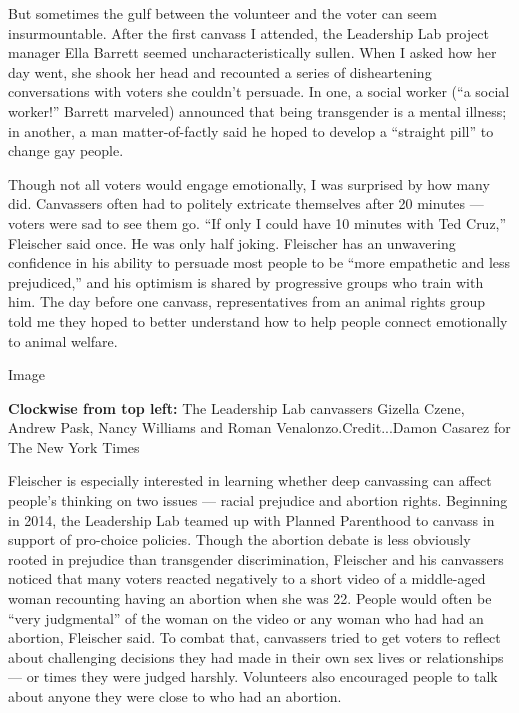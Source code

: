 But sometimes the gulf between the volunteer and the voter can seem
insurmountable. After the first canvass I attended, the Leadership Lab
project manager Ella Barrett seemed uncharacteristically sullen. When I
asked how her day went, she shook her head and recounted a series of
disheartening conversations with voters she couldn't persuade. In one, a
social worker (``a social worker!'' Barrett marveled) announced that
being transgender is a mental illness; in another, a man
matter-of-factly said he hoped to develop a ``straight pill'' to change
gay people.

Though not all voters would engage emotionally, I was surprised by how
many did. Canvassers often had to politely extricate themselves after 20
minutes --- voters were sad to see them go. ``If only I could have 10
minutes with Ted Cruz,'' Fleischer said once. He was only half joking.
Fleischer has an unwavering confidence in his ability to persuade most
people to be ``more empathetic and less prejudiced,'' and his optimism
is shared by progressive groups who train with him. The day before one
canvass, representatives from an animal rights group told me they hoped
to better understand how to help people connect emotionally to animal
welfare.

Image

\textbf{Clockwise from top left:} The Leadership Lab canvassers Gizella
Czene, Andrew Pask, Nancy Williams and Roman Venalonzo.Credit...Damon
Casarez for The New York Times

Fleischer is especially interested in learning whether deep canvassing
can affect people's thinking on two issues --- racial prejudice and
abortion rights. Beginning in 2014, the Leadership Lab teamed up with
Planned Parenthood to canvass in support of pro-choice policies. Though
the abortion debate is less obviously rooted in prejudice than
transgender discrimination, Fleischer and his canvassers noticed that
many voters reacted negatively to a short video of a middle-aged woman
recounting having an abortion when she was 22. People would often be
``very judgmental'' of the woman on the video or any woman who had had
an abortion, Fleischer said. To combat that, canvassers tried to get
voters to reflect about challenging decisions they had made in their own
sex lives or relationships --- or times they were judged harshly.
Volunteers also encouraged people to talk about anyone they were close
to who had an abortion.

